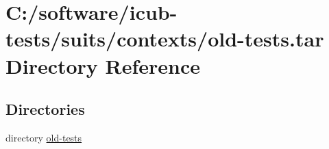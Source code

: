 \section{C\+:/software/icub-\/tests/suits/contexts/old-\/tests.tar Directory Reference}
\label{dir_a4e0617811b392d609ad3da5d5d1af03}
\subsection*{Directories}
\begin{DoxyCompactItemize}
\item 
directory \hyperlink{dir_a8030ebcf4bcb13e456652b57110c13a}{old-\/tests}
\end{DoxyCompactItemize}
